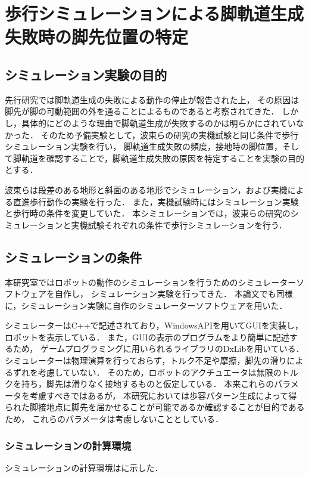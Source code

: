 \section{歩行シミュレーションによる脚軌道生成失敗時の脚先位置の特定}

\subsection{シミュレーション実験の目的}
先行研究では脚軌道生成の失敗による動作の停止が報告された上，
その原因は脚先が脚の可動範囲の外を通ることによるものであると考察されてきた．
しかし，具体的にどのような理由で脚軌道生成が失敗するのかは明らかにされていなかった．
そのため予備実験として，波東らの研究\cite{Hato_Graph_search}の実機試験と同じ条件で歩行シミュレーション実験を行い，
脚軌道生成失敗の頻度，接地時の脚位置，そして脚軌道を確認することで，脚軌道生成失敗の原因を特定することを実験の目的とする．

波東らは段差のある地形と斜面のある地形でシミュレーション，および実機による直進歩行動作の実験を行った．
また，実機試験時にはシミュレーション実験と歩行時の条件を変更していた．
本シミュレーションでは，波東らの研究のシミュレーションと実機試験それぞれの条件で歩行シミュレーションを行う．

\subsection{シミュレーションの条件}
本研究室ではロボットの動作のシミュレーションを行うためのシミュレーターソフトウェアを自作し，
シミュレーション実験を行ってきた．
本論文でも同様に，シミュレーション実験に自作のシミュレーターソフトウェアを用いた．

シミュレーターはC++で記述されており，WindowsAPIを用いてGUIを実装し，ロボットを表示している．
また，GUIの表示のプログラムをより簡単に記述するため，
ゲームプログラミングに用いられるライブラリのDxLib\cite{Dxlib_Web}を用いている．
シミュレーターは物理演算を行っておらず，トルク不足や摩擦，脚先の滑りによるずれを考慮していない．
そのため，ロボットのアクチュエータは無限のトルクを持ち，脚先は滑りなく接地するものと仮定している．
本来これらのパラメータを考慮すべきではあるが，
本研究においては歩容パターン生成によって得られた脚接地点に脚先を届かせることが可能であるか確認することが目的であるため，
これらのパラメータは考慮しないこととしている．

\subsubsection{シミュレーションの計算環境}
シミュレーションの計算環境はに示した．

